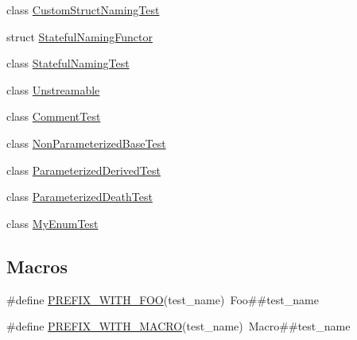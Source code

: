 \begin{DoxyCompactItemize}
class \mbox{\hyperlink{class_custom_struct_naming_test}{Custom\+Struct\+Naming\+Test}}
\item 
struct \mbox{\hyperlink{struct_stateful_naming_functor}{Stateful\+Naming\+Functor}}
\item 
class \mbox{\hyperlink{class_stateful_naming_test}{Stateful\+Naming\+Test}}
\item 
class \mbox{\hyperlink{class_unstreamable}{Unstreamable}}
\item 
class \mbox{\hyperlink{class_comment_test}{Comment\+Test}}
\item 
class \mbox{\hyperlink{class_non_parameterized_base_test}{Non\+Parameterized\+Base\+Test}}
\item 
class \mbox{\hyperlink{class_parameterized_derived_test}{Parameterized\+Derived\+Test}}
\item 
class \mbox{\hyperlink{class_parameterized_death_test}{Parameterized\+Death\+Test}}
\item 
class \mbox{\hyperlink{class_my_enum_test}{My\+Enum\+Test}}
\end{DoxyCompactItemize}
\subsection*{Macros}
\begin{DoxyCompactItemize}
\item 
\#define \mbox{\hyperlink{_obj__test_2lib_2googletest-master_2googletest_2test_2googletest-param-test-test_8cc_a6414de581a925e7399b27c14e38f8a67}{P\+R\+E\+F\+I\+X\+\_\+\+W\+I\+T\+H\+\_\+\+F\+OO}}(test\+\_\+name)~Foo\#\#test\+\_\+name
\item 
\#define \mbox{\hyperlink{_obj__test_2lib_2googletest-master_2googletest_2test_2googletest-param-test-test_8cc_aeb9b224f65fb5b0b8f2323a6903d6a68}{P\+R\+E\+F\+I\+X\+\_\+\+W\+I\+T\+H\+\_\+\+M\+A\+C\+RO}}(test\+\_\+name)~Macro\#\#test\+\_\+name
\end{DoxyCompactItemize}
